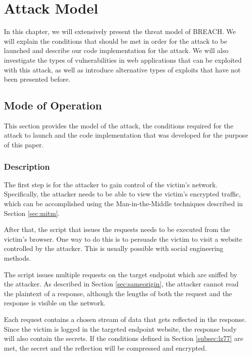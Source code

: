 \chapter{Attack Model}\label{ch:attack}

In this chapter, we will extensively present the threat model of BREACH. We will
explain the conditions that should be met in order for the attack to be
launched and describe our code implementation for the attack. We will also
investigate the types of vulnerabilities in web applications that can be
exploited with this attack, as well as introduce alternative types of exploits
that have not been presented before.

\section{Mode of Operation}\label{sec:mo}

This section provides the model of the attack, the conditions required for
the attack to launch and the code implementation that was developed for
the purpose of this paper.

\subsection{Description}

The first step is for the attacker to gain control of the victim's network.
Specifically, the attacker needs to be able to view the victim's encrypted
traffic, which can be accomplished using the Man-in-the-Middle techniques
described in Section \ref{sec:mitm}.

After that, the script that issues the requests needs to be executed from the
victim's browser. One way to do this is to persuade the victim to visit a
website controlled by the attacker. This is usually possible with social
engineering methods.

The script issues multiple requests on the target endpoint which are sniffed by
the attacker. As described in Section \ref{sec:sameorigin}, the attacker cannot
read the plaintext of a response, although the lengths of both the request and
the response is visible on the network.

Each request contains a chosen stream of data that gets reflected in the
response. Since the victim is logged in the targeted endpoint website, the
response body will also contain the secrets. If the conditions defined in
Section \ref{subsec:lz77} are met, the secret and the reflection will be
compressed and encrypted.

